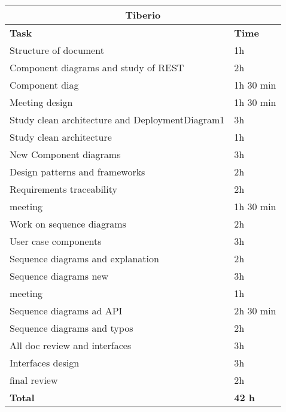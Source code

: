 \begin{table}[H]
\begin{tabular}{|l|l|}
\hline
\multicolumn{2}{|c|}{\textbf{Tiberio}}            \\ \hline
\textbf{Task}                   & \textbf{Time} \\ \hline
Structure of document                & 1h      \\ \hline
Component diagrams and study of REST       & 2h      \\ \hline
Component diag & 1h 30 min \\ \hline
Meeting design & 1h 30 min \\ \hline
Study clean architecture and DeploymentDiagram1 & 3h \\ \hline
Study clean architecture & 1h \\ \hline
New Component diagrams & 3h \\ \hline
Design patterns and frameworks & 2h \\ \hline
Requirements traceability & 2h \\ \hline
meeting & 1h 30 min \\ \hline
Work on sequence diagrams & 2h \\ \hline
User case components & 3h \\ \hline
Sequence diagrams and explanation & 2h \\ \hline
Sequence diagrams new & 3h \\ \hline
meeting & 1h \\ \hline
Sequence diagrams ad API & 2h 30 min \\ \hline
Sequence diagrams and typos & 2h \\ \hline
All doc review and interfaces & 3h \\ \hline
Interfaces design & 3h \\ \hline
final review & 2h \\ \hline
\rowcolor {polilight}
\textbf{Total}                  & \textbf{42 h}   \\ \hline
\end{tabular}
\end{table}


